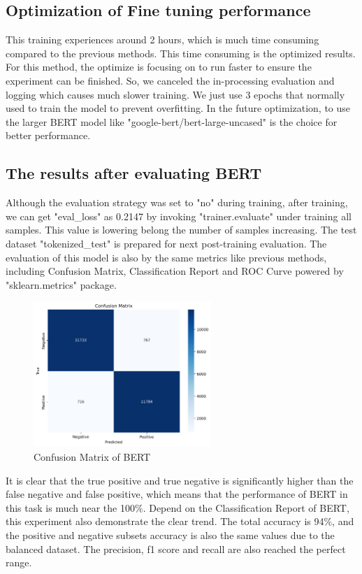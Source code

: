 \subsection{Optimization of Fine tuning performance}
This training experiences around 2 hours, which is much time consuming compared to the previous methods. This time consuming is the optimized results. For this method, the optimize is focusing on to run faster to ensure the experiment can be finished. So, we canceled the in-processing evaluation and logging which causes much slower training. We just use 3 epochs that normally used to train the model to prevent overfitting. In the future optimization, to use the larger BERT model like "google-bert/bert-large-uncased" is the choice for better performance. 

\subsection{The results after evaluating BERT}

Although the evaluation strategy was set to "no" during training, after training, we can get "eval\_loss" as 0.2147 by invoking "trainer.evaluate" under training all samples. This value is lowering belong the number of samples increasing. The test dataset "tokenized\_test" is prepared for next post-training evaluation. The evaluation of this model is also by the same metrics like previous methods, including Confusion Matrix, Classification Report and ROC Curve powered by "sklearn.metrics" package.

\begin{figure}[ht]
    \centering
    \includegraphics[width=0.6\textwidth]{pics/bert_matrix.png}
    \caption{Confusion Matrix of BERT}
\end{figure}

It is clear that the true positive and true negative is significantly higher than the false negative and false positive, which means that the performance of BERT in this task is much near the 100\%. Depend on the Classification Report of BERT, this experiment also demonstrate the clear trend. The total accuracy is 94\%, and the positive and negative subsets accuracy is also the same values due to the balanced dataset. The precision, f1 score and recall are also reached the perfect range.

